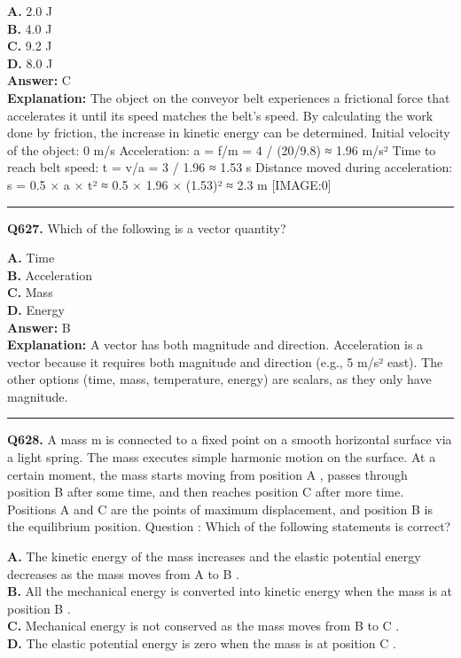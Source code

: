 \documentclass[12pt]{article}
\begin{document}
\textbf{A.} 2.0 J \\
\textbf{B.} 4.0 J \\
\textbf{C.} 9.2 J \\
\textbf{D.} 8.0 J \\

\textbf{Answer:} C \\
\textbf{Explanation:} The object on the conveyor belt experiences a frictional force that accelerates it until its speed matches the belt's speed. By calculating the work done by friction, the increase in kinetic energy can be determined.
Initial velocity of the object: 0 m/s
Acceleration: a = f/m = 4 / (20/9.8) ≈ 1.96 m/s²
Time to reach belt speed: t = v/a = 3 / 1.96 ≈ 1.53 s
Distance moved during acceleration: s = 0.5 × a × t² ≈ 0.5 × 1.96 × (1.53)² ≈ 2.3 m
[IMAGE:0]

\hrule
\vspace{1em}


\noindent
\textbf{Q627.} Which of the following is a vector quantity?



\textbf{A.} Time \\
\textbf{B.} Acceleration \\
\textbf{C.} Mass \\
\textbf{D.} Energy \\

\textbf{Answer:} B \\
\textbf{Explanation:} A vector has both magnitude and direction. Acceleration is a vector because it requires both magnitude and direction (e.g., 5 m/s² east). The other options (time, mass, temperature, energy) are scalars, as they only have magnitude.

\hrule
\vspace{1em}


\noindent
\textbf{Q628.} A mass
m
is connected to a fixed point on a smooth horizontal surface via a light spring. The mass executes simple harmonic motion on the surface. At a certain moment, the mass starts moving from position
A
, passes through position
B
after some time, and then reaches position
C
after more time. Positions
A
and
C
are the points of maximum displacement, and position
B
is the equilibrium position.
Question
: Which of the following statements is correct?



\textbf{A.} The kinetic energy of the mass increases and the elastic potential energy decreases as the mass moves from
A
to
B
. \\
\textbf{B.} All the mechanical energy is converted into kinetic energy when the mass is at position
B
. \\
\textbf{C.} Mechanical energy is
not
conserved as the mass moves from
B
to
C
. \\
\textbf{D.} The elastic potential energy is zero when the mass is at position
C
. \\
\end{document}
